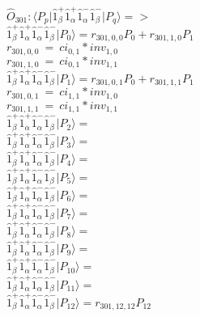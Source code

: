 \documentclass[14pt]{article}
\begin{document}
    $\hat{O}_{301}:  \langle{P_p}\vert \hat{1}_{\beta}^{+}\hat{1}_{\alpha}^{+}\hat{1}_{\alpha}^{-}\hat{1}_{\beta}^{-} \vert{P_q}\rangle => $ \\ 
    $ \hat{1}_{\beta}^{+}\hat{1}_{\alpha}^{+}\hat{1}_{\alpha}^{-}\hat{1}_{\beta}^{-} \vert{P_{0}}\rangle = {r}_{301,0,0}P_{0}+{r}_{301,1,0}P_{1} $ \\ 
    ${r}_{301,0,0}\ =\ {ci}_{0,1}*{inv}_{1,0} $ \\ 
    ${r}_{301,1,0}\ =\ {ci}_{0,1}*{inv}_{1,1} $ \\ 
    $ \hat{1}_{\beta}^{+}\hat{1}_{\alpha}^{+}\hat{1}_{\alpha}^{-}\hat{1}_{\beta}^{-} \vert{P_{1}}\rangle = {r}_{301,0,1}P_{0}+{r}_{301,1,1}P_{1} $ \\ 
    ${r}_{301,0,1}\ =\ {ci}_{1,1}*{inv}_{1,0} $ \\ 
    ${r}_{301,1,1}\ =\ {ci}_{1,1}*{inv}_{1,1} $ \\ 
    $ \hat{1}_{\beta}^{+}\hat{1}_{\alpha}^{+}\hat{1}_{\alpha}^{-}\hat{1}_{\beta}^{-} \vert{P_{2}}\rangle =  $ \\ 
    $ \hat{1}_{\beta}^{+}\hat{1}_{\alpha}^{+}\hat{1}_{\alpha}^{-}\hat{1}_{\beta}^{-} \vert{P_{3}}\rangle =  $ \\ 
    $ \hat{1}_{\beta}^{+}\hat{1}_{\alpha}^{+}\hat{1}_{\alpha}^{-}\hat{1}_{\beta}^{-} \vert{P_{4}}\rangle =  $ \\ 
    $ \hat{1}_{\beta}^{+}\hat{1}_{\alpha}^{+}\hat{1}_{\alpha}^{-}\hat{1}_{\beta}^{-} \vert{P_{5}}\rangle =  $ \\ 
    $ \hat{1}_{\beta}^{+}\hat{1}_{\alpha}^{+}\hat{1}_{\alpha}^{-}\hat{1}_{\beta}^{-} \vert{P_{6}}\rangle =  $ \\ 
    $ \hat{1}_{\beta}^{+}\hat{1}_{\alpha}^{+}\hat{1}_{\alpha}^{-}\hat{1}_{\beta}^{-} \vert{P_{7}}\rangle =  $ \\ 
    $ \hat{1}_{\beta}^{+}\hat{1}_{\alpha}^{+}\hat{1}_{\alpha}^{-}\hat{1}_{\beta}^{-} \vert{P_{8}}\rangle =  $ \\ 
    $ \hat{1}_{\beta}^{+}\hat{1}_{\alpha}^{+}\hat{1}_{\alpha}^{-}\hat{1}_{\beta}^{-} \vert{P_{9}}\rangle =  $ \\ 
    $ \hat{1}_{\beta}^{+}\hat{1}_{\alpha}^{+}\hat{1}_{\alpha}^{-}\hat{1}_{\beta}^{-} \vert{P_{10}}\rangle =  $ \\ 
    $ \hat{1}_{\beta}^{+}\hat{1}_{\alpha}^{+}\hat{1}_{\alpha}^{-}\hat{1}_{\beta}^{-} \vert{P_{11}}\rangle =  $ \\ 
    $ \hat{1}_{\beta}^{+}\hat{1}_{\alpha}^{+}\hat{1}_{\alpha}^{-}\hat{1}_{\beta}^{-} \vert{P_{12}}\rangle = {r}_{301,12,12}P_{12} $ \\ 
\end{document}
